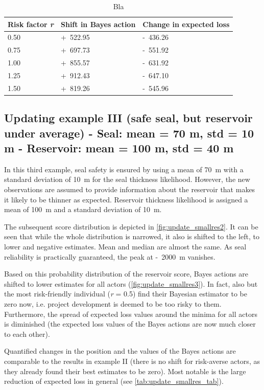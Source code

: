 	\begin{table}
		\centering
		\begin{tabular}[c]{| l | l | l |}
			\hline
			Risk factor \textit{r} & Shift in Bayes action & Change in expected loss \\ \hline
			0.50 & +~522.95 & -~436.26 \\ 
			0.75 & +~697.73 & -~551.92  \\ 
			1.00 & +~855.57 & -~631.92 \\ 
			1.25 & +~912.43 & -~647.10 \\ 
			1.50 & +~819.26 & -~545.96  \\ 
			\hline
		\end{tabular}
		\caption{Bla}
		\label{tab:update_goodseal_tab}
	\end{table}
	
	\subsection{Updating example III (safe seal, but reservoir under average) - Seal: mean = 70 m, std = 10 m - Reservoir: mean = 100 m, std = 40 m}
	
	In this third example, seal safety is ensured by using a mean of 70~m with a standard deviation of 10~m for the seal thickness likelihood. However, the new observations are assumed to provide information about the reservoir that makes it likely to be thinner as expected. Reservoir thickness likelihood is assigned a mean of 100~m and a standard deviation of 10~m. 
	
	The subsequent score distribution is depicted in \ref{fig:update_smallres2}. It can be seen that while the whole distribution is narrowed, it also is shifted to the left, to lower and negative estimates. Mean and median are almost the same. As seal reliability is practically guaranteed, the peak at -~2000~m vanishes. 
	
	Based on this probability distribution of the reservoir score, Bayes actions are shifted to lower estimates for all actors (\ref{fig:update_smallres3}). In fact, also but the most risk-friendly individual (\textit{r} = 0.5) find their Bayesian estimator to be zero now, i.e. project development is deemed to be too risky to them. Furthermore, the spread of expected loss values around the minima for all actors is diminished (the expected loss values of the Bayes actions are now much closer to each other).
	
	Quantified changes in the position and the values of the Bayes actions are comparable to the results in example II (there is no shift for risk-averse actors, as they already found their best estimates to be zero). Most notable is the large reduction of expected loss in general (see \ref{tab:update_smallres_tab}).	
	
